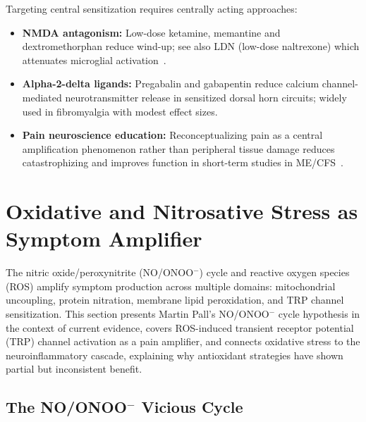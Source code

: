 Targeting central sensitization requires centrally acting approaches:
\begin{itemize}
  \item \textbf{NMDA antagonism:} Low-dose ketamine, memantine and dextromethorphan reduce wind-up; see also LDN (low-dose naltrexone) which attenuates microglial activation~\cite{Polo2019LDN}.
  \item \textbf{Alpha-2-delta ligands:} Pregabalin and gabapentin reduce calcium channel-mediated neurotransmitter release in sensitized dorsal horn circuits; widely used in fibromyalgia with modest effect sizes.
  \item \textbf{Pain neuroscience education:} Reconceptualizing pain as a central amplification phenomenon rather than peripheral tissue damage reduces catastrophizing and improves function in short-term studies in ME/CFS~\cite{Nijs2012painCFS}.
\end{itemize}


\section{Oxidative and Nitrosative Stress as Symptom Amplifier}
\label{sec:ch15-oxidative-stress}

The nitric oxide/peroxynitrite (NO/ONOO$^-$) cycle and reactive oxygen species (ROS) amplify symptom production across multiple domains: mitochondrial uncoupling, protein nitration, membrane lipid peroxidation, and TRP channel sensitization. This section presents Martin Pall's NO/ONOO$^-$ cycle hypothesis in the context of current evidence, covers ROS-induced transient receptor potential (TRP) channel activation as a pain amplifier, and connects oxidative stress to the neuroinflammatory cascade, explaining why antioxidant strategies have shown partial but inconsistent benefit.

\subsection{The NO/ONOO$^-$ Vicious Cycle}

